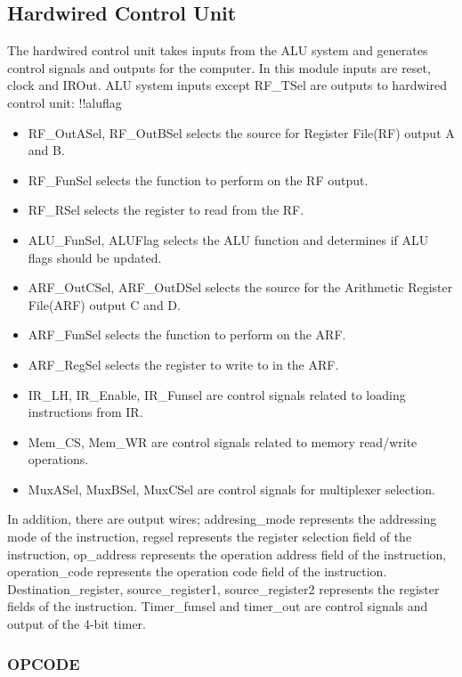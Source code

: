 \documentclass[16pt]{article}
\begin{document}
\subsection{Hardwired Control Unit}
The hardwired control unit takes inputs from the ALU system and generates control signals and outputs for the computer. In this module inputs are reset, clock and IROut. ALU system inputs except RF\_TSel are outputs to hardwired control unit: !!aluflag
\begin{itemize}
    \item RF\_OutASel, RF\_OutBSel selects the source for Register File(RF) output A and B.
    \item RF\_FunSel selects the function to perform on the RF output.
    \item RF\_RSel selects the register to read from the RF.
    \item ALU\_FunSel, ALUFlag selects the ALU function and determines if ALU flags should be updated.
    \item ARF\_OutCSel, ARF\_OutDSel selects the source for the Arithmetic Register File(ARF) output C and D.
    \item ARF\_FunSel selects the function to perform on the ARF.
    \item ARF\_RegSel selects the register to write to in the ARF.
    \item IR\_LH, IR\_Enable, IR\_Funsel are control signals related to loading instructions from IR.
    \item Mem\_CS, Mem\_WR are control signals related to memory read/write operations.
    \item MuxASel, MuxBSel, MuxCSel are control signals for multiplexer selection.
\end{itemize}

In addition, there are output wires; addresing\_mode represents the addressing mode of the instruction,
regsel represents the register selection field of the instruction,
op\_address represents the operation address field of the instruction,
operation\_code represents the operation code field of the instruction.
Destination\_register, source\_register1, source\_register2 represents the register fields of the instruction.
Timer\_funsel and timer\_out are control signals and output of the 4-bit timer.


\subsubsection{OPCODE}
\end{document}
